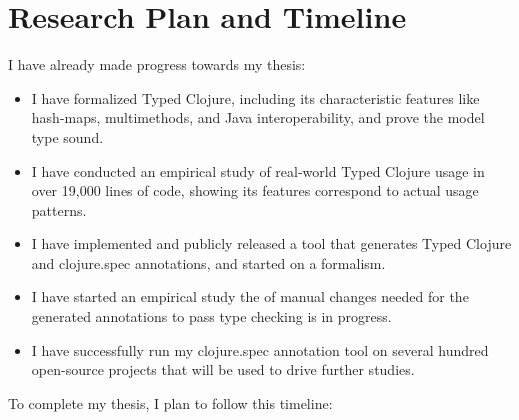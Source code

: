 \documentclass[9pt]{extarticle}
\begin{document}

\section{Research Plan and Timeline}

I have already made progress towards my thesis:

\begin{itemize}
  \item I have formalized Typed Clojure, including
    its characteristic features like hash-maps, multimethods, and Java interoperability,
    and prove the model type sound.
  \item I have conducted an empirical study of real-world Typed Clojure usage
    in over 19,000 lines of code, showing its features correspond to actual usage patterns.
  \item I have implemented and publicly released a tool that generates
    Typed Clojure and clojure.spec annotations, and started on a formalism.
  \item I have started an empirical study the of manual changes needed for the generated annotations
    to pass type checking is in progress.
  \item I have successfully run my clojure.spec annotation tool on several hundred open-source projects that
    will be used to drive further studies.
\end{itemize}

To complete my thesis, I plan to follow this timeline:
\end{document}
